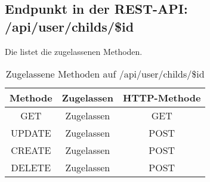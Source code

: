 \subsection{Endpunkt in der REST-API: /api/user/childs/\$id}
Die  listet die zugelassenen Methoden. 

\begin{table}[!htbp]
	\begin{tabular}{|c|c|c|}
		\hline
			\textbf{Methode} & \textbf{Zugelassen} & \textbf{HTTP-Methode} \\ \hline
			GET & Zugelassen & GET \\ \hline
			UPDATE & Zugelassen & POST \\ \hline 
			CREATE & Zugelassen & POST \\ \hline 
			DELETE & Zugelassen & POST \\ \hline
	\end{tabular}

		\caption{Zugelassene Methoden auf /api/user/childs/\$id}
		\label{tab:end:rest:api:user:childs:id:meth}
\end{table}